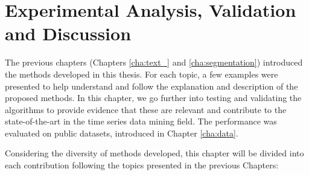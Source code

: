 

%

\chapter{Experimental Analysis, Validation and Discussion}
\label{cha:results}

The previous chapters (Chapters \ref{cha:text_} and \ref{cha:segmentation}) introduced the methods developed in this thesis. For each topic, a few examples were presented to help understand and follow the explanation and description of the proposed methods. In this chapter, we go further into testing and validating the algorithms to provide evidence that these are relevant and contribute to the state-of-the-art in the time series data mining field. The performance was evaluated on public datasets, introduced in Chapter \ref{cha:data}.
\par
Considering the diversity of methods developed, this chapter will be divided into each contribution following the topics presented in the previous Chapters:

